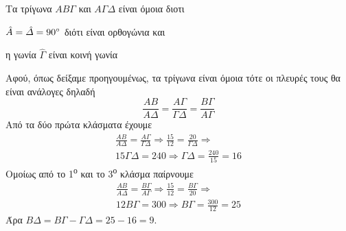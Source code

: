 \documentclass[twoside,nofonts,internet,math,spyros]{frontisthrio-diag}
\newcommand{\tss}[1]{\textsuperscript{#1}}
\begin{document}
\begin{thema}
\begin{erwthma}
{
}{
\item 
\begin{alist}
\item Τα τρίγωνα $ AB\varGamma $ και $ A\varGamma\varDelta $ είναι όμοια διοτι
\begin{rlist}
\item $ \hat{A}=\hat{\varDelta}=90\degree $ διότι είναι ορθογώνια και
\item η γωνία $ \hat{\varGamma} $ είναι κοινή γωνία
\end{rlist}
\item Αφού, όπως δείξαμε προηγουμένως, τα τρίγωνα είναι όμοια τότε οι πλευρές τους θα είναι ανάλογες δηλαδή
\[ \frac{AB}{A\varDelta}=\frac{A\varGamma}{\varGamma\varDelta}=\frac{B\varGamma}{A\varGamma} \]
Από τα δύο πρώτα κλάσματα έχουμε
\begin{gather*}
\frac{AB}{A\varDelta}=\frac{A\varGamma}{\varGamma\varDelta}\Rightarrow\frac{15}{12}=\frac{20}{\varGamma\varDelta}\Rightarrow\\
15\varGamma\varDelta=240\Rightarrow \varGamma\varDelta=\frac{240}{15}=16
\end{gather*}
Ομοίως από το 1\tss{ο} και το 3\tss{ο} κλάσμα παίρνουμε
\begin{gather*}
\frac{AB}{A\varDelta}=\frac{B\varGamma}{A\varGamma}\Rightarrow\frac{15}{12}=\frac{B\varGamma}{20}\Rightarrow\\
12 B\varGamma=300\Rightarrow B\varGamma=\frac{300}{12}=25
\end{gather*}
Άρα $ B\varDelta=B\varGamma-\varGamma\varDelta=25-16=9 $.
\end{alist}}
\end{erwthma}
\end{thema}
\end{document}
